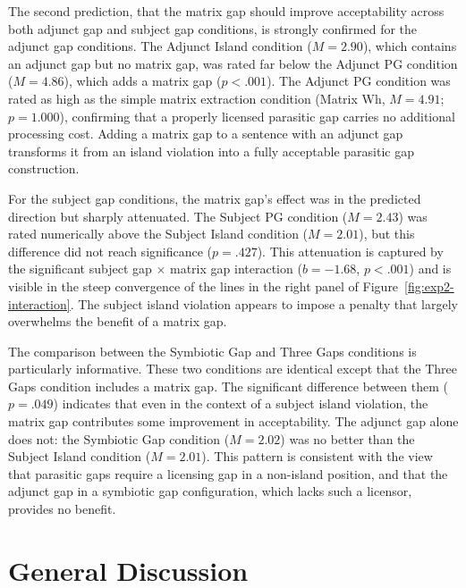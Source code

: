 \documentclass[12pt]{article}
\begin{document}
The second prediction, that the matrix gap should improve acceptability across both adjunct gap and subject gap conditions, is strongly confirmed for the adjunct gap conditions. The Adjunct Island condition ($M = 2.90$), which contains an adjunct gap but no matrix gap, was rated far below the Adjunct PG condition ($M = 4.86$), which adds a matrix gap ($p < .001$). The Adjunct PG condition was rated as high as the simple matrix extraction condition (Matrix Wh, $M = 4.91$; $p = 1.000$), confirming that a properly licensed parasitic gap carries no additional processing cost. Adding a matrix gap to a sentence with an adjunct gap transforms it from an island violation into a fully acceptable parasitic gap construction.

For the subject gap conditions, the matrix gap's effect was in the predicted direction but sharply attenuated. The Subject PG condition ($M = 2.43$) was rated numerically above the Subject Island condition ($M = 2.01$), but this difference did not reach significance ($p = .427$). This attenuation is captured by the significant subject gap $\times$ matrix gap interaction ($b = -1.68$, $p < .001$) and is visible in the steep convergence of the lines in the right panel of Figure~\ref{fig:exp2-interaction}. The subject island violation appears to impose a penalty that largely overwhelms the benefit of a matrix gap.

The comparison between the Symbiotic Gap and Three Gaps conditions is particularly informative. These two conditions are identical except that the Three Gaps condition includes a matrix gap. The significant difference between them ($p = .049$) indicates that even in the context of a subject island violation, the matrix gap contributes some improvement in acceptability. The adjunct gap alone does not: the Symbiotic Gap condition ($M = 2.02$) was no better than the Subject Island condition ($M = 2.01$). This pattern is consistent with the view that parasitic gaps require a licensing gap in a non-island position, and that the adjunct gap in a symbiotic gap configuration, which lacks such a licensor, provides no benefit.


\section{General Discussion}\label{sec:discussion}
\end{document}
